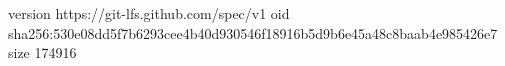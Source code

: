 version https://git-lfs.github.com/spec/v1
oid sha256:530e08dd5f7b6293cee4b40d930546f18916b5d9b6e45a48c8baab4e985426e7
size 174916
